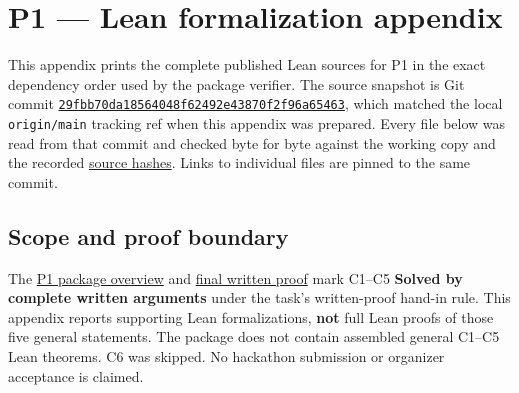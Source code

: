 \documentclass[11pt,a4paper]{article}
\begin{document}
\section{P1 --- Lean formalization appendix}\label{p1-lean-formalization-appendix}

This appendix prints the complete published Lean sources for P1 in the exact dependency order used by the package verifier. The source snapshot is Git commit \href{https://github.com/mpelteshki/climbing-to-the-frontier/commit/29fbb70da18564048f62492e43870f2f96a65463}{\texttt{29fbb70d\allowbreak{}a1856404\allowbreak{}8f62492e\allowbreak{}43870f2f\allowbreak{}96a65463}}, which matched the local \texttt{origin/main} tracking ref when this appendix was prepared. Every file below was read from that commit and checked byte for byte against the working copy and the recorded \href{https://github.com/mpelteshki/climbing-to-the-frontier/blob/29fbb70da18564048f62492e43870f2f96a65463/cagent/p1/evidence/source-sha256.txt}{source hashes}. Links to individual files are pinned to the same commit.

\subsection{Scope and proof boundary}\label{scope-and-proof-boundary}

The \href{https://github.com/mpelteshki/climbing-to-the-frontier/blob/29fbb70da18564048f62492e43870f2f96a65463/cagent/p1/README.md}{P1 package overview} and \href{https://github.com/mpelteshki/climbing-to-the-frontier/blob/29fbb70da18564048f62492e43870f2f96a65463/cagent/p1/writeup.md}{final written proof} mark C1--C5 \textbf{Solved by complete written arguments} under the task's written-proof hand-in rule. This appendix reports supporting Lean formalizations, \textbf{not} full Lean proofs of those five general statements. The package does not contain assembled general C1--C5 Lean theorems. C6 was skipped. No hackathon submission or organizer acceptance is claimed.
\end{document}
